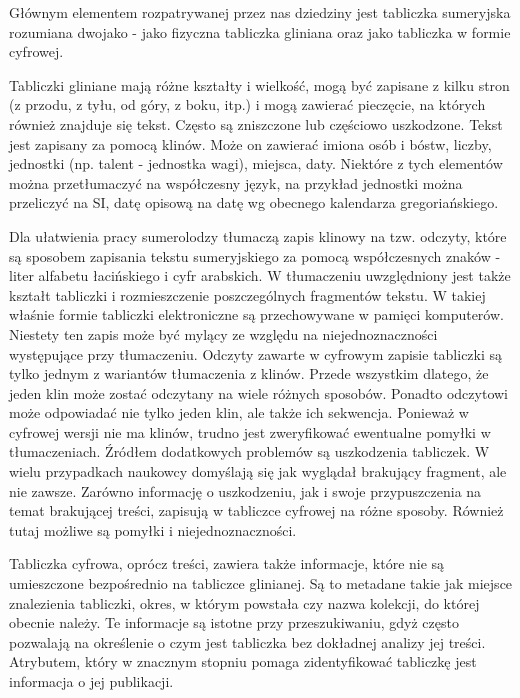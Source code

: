 Głównym elementem rozpatrywanej przez nas dziedziny jest tabliczka sumeryjska rozumiana dwojako - jako fizyczna tabliczka gliniana oraz jako tabliczka w formie cyfrowej.

Tabliczki gliniane mają różne kształty i wielkość, mogą być zapisane z kilku stron (z przodu, z tyłu, od góry, z boku, itp.) i mogą zawierać pieczęcie, na których również znajduje się tekst. Często są zniszczone lub częściowo uszkodzone. Tekst jest zapisany za pomocą klinów.
Może on zawierać imiona osób i bóstw, liczby, jednostki (np. talent - jednostka wagi), %
miejsca, daty. Niektóre z tych elementów można przetłumaczyć na współczesny język, na przykład jednostki można przeliczyć na SI, datę opisową na datę wg obecnego kalendarza gregoriańskiego. 

Dla ułatwienia pracy sumerolodzy tłumaczą zapis klinowy na tzw. odczyty, które są sposobem zapisania tekstu sumeryjskiego za pomocą współczesnych znaków - liter alfabetu łacińskiego i cyfr arabskich. W tłumaczeniu uwzględniony jest także kształt tabliczki i rozmieszczenie poszczególnych fragmentów tekstu. W takiej właśnie formie tabliczki elektroniczne są przechowywane w pamięci komputerów. Niestety ten zapis może być mylący ze względu na niejednoznaczności występujące przy tłumaczeniu. Odczyty zawarte w cyfrowym zapisie tabliczki są tylko jednym z wariantów tłumaczenia z klinów. Przede wszystkim dlatego, że jeden klin może zostać odczytany na wiele różnych sposobów. Ponadto odczytowi może odpowiadać nie tylko jeden klin, ale także ich sekwencja. Ponieważ w cyfrowej wersji nie ma klinów, trudno jest zweryfikować ewentualne pomyłki w tłumaczeniach.
Źródłem dodatkowych problemów są uszkodzenia tabliczek. W wielu przypadkach naukowcy domyślają się jak wyglądał brakujący fragment, ale nie zawsze. Zarówno informację o uszkodzeniu, jak i swoje przypuszczenia na temat brakującej treści, zapisują w tabliczce cyfrowej na różne sposoby. Również tutaj możliwe są pomyłki i niejednoznaczności.

Tabliczka cyfrowa, oprócz treści, zawiera także informacje, które nie są umieszczone bezpośrednio na tabliczce glinianej. Są to metadane takie jak miejsce znalezienia tabliczki, okres, w którym powstała czy nazwa kolekcji, do której obecnie należy. Te informacje są istotne przy przeszukiwaniu, gdyż często pozwalają na określenie o czym jest tabliczka bez dokładnej analizy jej treści. Atrybutem, który w znacznym stopniu pomaga zidentyfikować tabliczkę jest informacja o jej publikacji.


